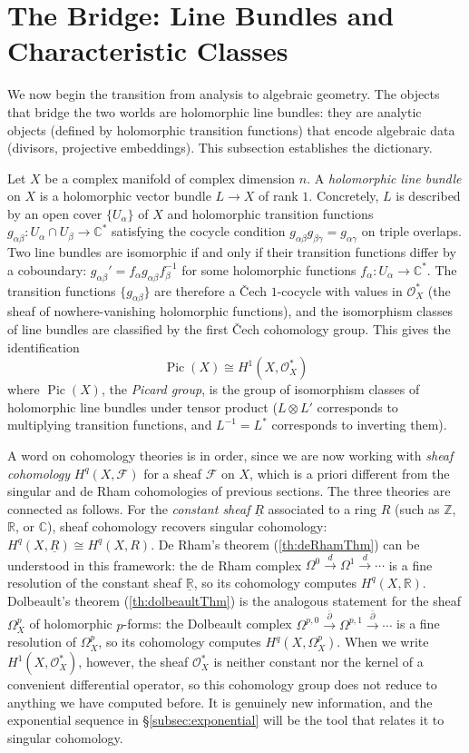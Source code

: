 \documentclass{article}
\newcommand{\C}{\mathbb{C}}
\newcommand{\R}{\mathbb{R}}
\newcommand{\Z}{{\mathbb{Z}}}
\newcommand{\CO}{\mathcal{O}}
\newcommand{\Pic}{\operatorname{Pic}}
\newcommand{\SF}{\mathscr{F}}
\begin{document}
\section{The Bridge: Line Bundles and Characteristic Classes}\label{sec:bridge}

We now begin the transition from analysis to algebraic geometry. The objects
that bridge the two worlds are holomorphic line bundles: they are analytic
objects (defined by holomorphic transition functions) that encode algebraic
data (divisors, projective embeddings). This subsection establishes the
dictionary.

Let $X$ be a complex manifold of complex dimension $n$. A \emph{holomorphic
line bundle} on $X$ is a holomorphic vector bundle $L \to X$ of rank $1$.
Concretely, $L$ is described by an open cover $\{U_\alpha\}$ of $X$ and
holomorphic transition functions $g_{\alpha\beta}: U_\alpha \cap U_\beta \to
\C^*$ satisfying the cocycle condition
$g_{\alpha\beta} g_{\beta\gamma} = g_{\alpha\gamma}$ on triple overlaps. Two
line bundles are isomorphic if and only if their transition functions differ by
a coboundary: $g_{\alpha\beta}' = f_\alpha g_{\alpha\beta} f_\beta^{-1}$ for
some holomorphic functions $f_\alpha: U_\alpha \to \C^*$. The transition
functions $\{g_{\alpha\beta}\}$ are therefore a \v{C}ech $1$-cocycle with
values in $\CO_X^*$ (the sheaf of nowhere-vanishing holomorphic functions),
and the isomorphism classes of line bundles are classified by the first
\v{C}ech cohomology group. This gives the identification
\[
  \Pic(X) \cong H^1(X, \CO_X^*)
\]
where $\Pic(X)$, the \emph{Picard group}, is the group of isomorphism classes
of holomorphic line bundles under tensor product ($L \otimes L'$ corresponds to
multiplying transition functions, and $L^{-1} = L^*$ corresponds to inverting
them).

A word on cohomology theories is in order, since we are now working with
\emph{sheaf cohomology} $H^q(X, \SF)$ for a sheaf $\SF$ on $X$, which is a
priori different from the singular and de Rham cohomologies of previous
sections. The three theories are connected as follows. For the \emph{constant
sheaf} $\underline{R}$ associated to a ring $R$ (such as $\Z$, $\R$, or $\C$),
sheaf cohomology recovers singular cohomology: $H^q(X, \underline{R}) \cong
H^q(X, R)$. De Rham's theorem (\ref{th:deRhamThm}) can be understood in this
framework: the de Rham complex $\Omega^0 \xrightarrow{d} \Omega^1
\xrightarrow{d} \cdots$ is a fine resolution of the constant sheaf
$\underline{\R}$, so its cohomology computes $H^q(X, \R)$. Dolbeault's theorem
(\ref{th:dolbeaultThm}) is the analogous statement for the sheaf $\Omega^p_X$
of holomorphic $p$-forms: the Dolbeault complex $\Omega^{p,0}
\xrightarrow{\bar\partial} \Omega^{p,1} \xrightarrow{\bar\partial} \cdots$ is
a fine resolution of $\Omega^p_X$, so its cohomology computes
$H^q(X, \Omega^p_X)$. When we write $H^1(X, \CO_X^*)$, however, the sheaf
$\CO_X^*$ is neither constant nor the kernel of a convenient differential
operator, so this cohomology group does not reduce to anything we have computed
before. It is genuinely new information, and the exponential sequence in
\S\ref{subsec:exponential} will be the tool that relates it to singular
cohomology.
\end{document}
